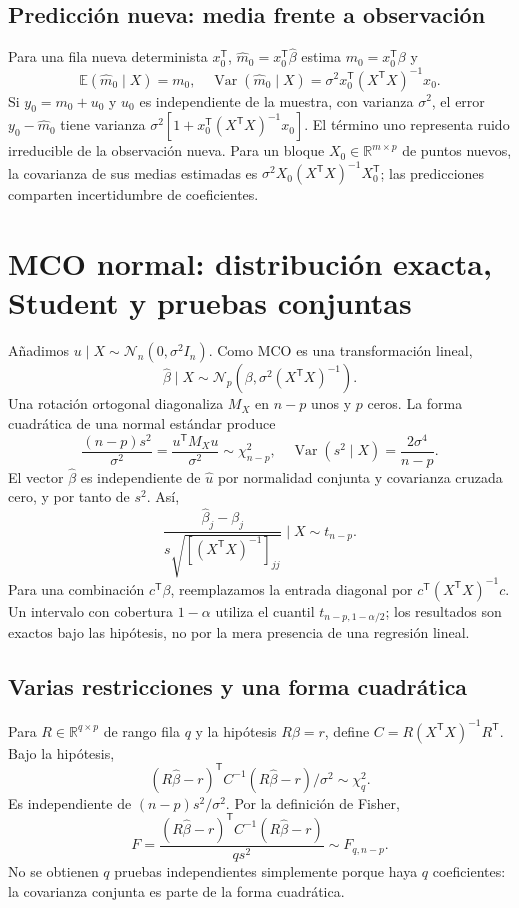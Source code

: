\documentclass[11pt,a4paper]{article}
\newcommand{\R}{\mathbb R}
\newcommand{\E}{\mathbb E}
\newcommand{\T}{^{\mathsf T}}
\DeclareMathOperator{\Var}{Var}
\theoremstyle{definition}
\begin{document}
\subsection{Predicción nueva: media frente a observación}
Para una fila nueva determinista $x_0\T$, $\widehat m_0=x_0\T\widehat\beta$ estima $m_0=x_0\T\beta$ y
\[
\E(\widehat m_0\mid X)=m_0,\quad
\Var(\widehat m_0\mid X)=\sigma^2x_0\T(X\T X)^{-1}x_0.
\]
Si $y_0=m_0+u_0$ y $u_0$ es independiente de la muestra, con varianza $\sigma^2$, el error $y_0-\widehat m_0$ tiene varianza $\sigma^2[1+x_0\T(X\T X)^{-1}x_0]$. El término uno representa ruido irreducible de la observación nueva. Para un bloque $X_0\in\R^{m\times p}$ de puntos nuevos, la covarianza de sus medias estimadas es $\sigma^2X_0(X\T X)^{-1}X_0\T$; las predicciones comparten incertidumbre de coeficientes.

\section{MCO normal: distribución exacta, Student y pruebas conjuntas}
Añadimos $u\mid X\sim\mathcal N_n(0,\sigma^2I_n)$. Como MCO es una transformación lineal,
\[
\widehat\beta\mid X\sim\mathcal N_p\!\left(\beta,\sigma^2(X\T X)^{-1}\right).
\]
Una rotación ortogonal diagonaliza $M_X$ en $n-p$ unos y $p$ ceros. La forma cuadrática de una normal estándar produce
\[
\frac{(n-p)s^2}{\sigma^2}=\frac{u\T M_Xu}{\sigma^2}\sim\chi^2_{n-p},
\quad\Var(s^2\mid X)=\frac{2\sigma^4}{n-p}.
\]
El vector $\widehat\beta$ es independiente de $\widehat u$ por normalidad conjunta y covarianza cruzada cero, y por tanto de $s^2$. Así,
\[
\boxed{\frac{\widehat\beta_j-\beta_j}{s\sqrt{[(X\T X)^{-1}]_{jj}}}\mid X\sim t_{n-p}}.
\]
Para una combinación $c\T\beta$, reemplazamos la entrada diagonal por $c\T(X\T X)^{-1}c$. Un intervalo con cobertura $1-\alpha$ utiliza el cuantil $t_{n-p,1-\alpha/2}$; los resultados son exactos bajo las hipótesis, no por la mera presencia de una regresión lineal.
\subsection{Varias restricciones y una forma cuadrática}
Para $R\in\R^{q\times p}$ de rango fila $q$ y la hipótesis $R\beta=r$, define $C=R(X\T X)^{-1}R\T$. Bajo la hipótesis,
\[
(R\widehat\beta-r)\T C^{-1}(R\widehat\beta-r)/\sigma^2\sim\chi^2_q.
\]
Es independiente de $(n-p)s^2/\sigma^2$. Por la definición de Fisher,
\[
F=\frac{(R\widehat\beta-r)\T C^{-1}(R\widehat\beta-r)}{q s^2}\sim F_{q,n-p}.
\]
No se obtienen $q$ pruebas independientes simplemente porque haya $q$ coeficientes: la covarianza conjunta es parte de la forma cuadrática.
\end{document}
